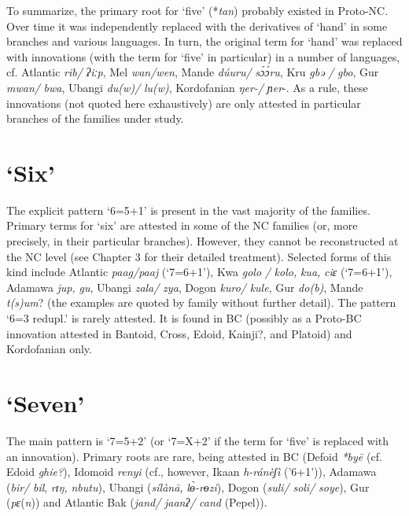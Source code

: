 To summarize, the primary root for ‘five’ (*\textit{tan}) probably existed in Proto-NC. Over time it was independently replaced with the derivatives of ‘hand’ in some branches and various languages. In turn, the original term for ‘hand’ was replaced with innovations (with the term for ‘five’ in particular) in a number of languages, cf. Atlantic \textit{rib/} \textit{ʔiːp}, Mel \textit{wan/wen}, Mande \textit{dúuru/} \textit{s{\'{ɔ}}{\'{ɔ}}ru}, Kru \textit{gbə} \textit{/} \textit{gbo}, Gur \textit{mwan/} \textit{bwa}, Ubangi \textit{du(w)/} \textit{lu(w)}, Kordofanian \textit{ŋer-/} \textit{ɲer}-. As a rule, these innovations (not quoted here exhaustively) are only attested in particular branches of the families under study. 


\section{‘Six’}%
 \largerpage
The explicit pattern ‘6=5+1’ is present in the vast majority of the families. Primary terms for ‘six’ are attested in some of the NC families (or, more precisely, in their particular branches). However, they cannot be reconstructed at the NC level (see Chapter 3 for their detailed treatment). Selected forms of this kind include Atlantic \textit{paag/paaj} (‘7=6+1’), Kwa \textit{golo} \textit{/} \textit{kolo,} \textit{kua,} \textit{ciɛ} (‘7=6+1’), Adamawa \textit{jup,} \textit{gu}, Ubangi \textit{zala/} \textit{zya}, Dogon \textit{kuro/} \textit{kule}, Gur \textit{do(b)}, Mande \textit{t(s)um}? (the examples are quoted by family without further detail). The pattern ‘6=3 redupl.’ is rarely attested. It is found in BC (possibly as a Proto-BC innovation attested in Bantoid, Cross, Edoid, Kainji?, and Platoid) and Kordofanian only.


\section{‘Seven’}%
The main pattern is ‘7=5+2’ (or ‘7=X+2’ if the term for ‘five’ is replaced with an innovation). Primary roots are rare, being attested in BC (Defoid \textit{*by{\={e}}} (cf. Edoid \textit{ghie?}), Idomoid \textit{renyi} (cf., however, Ikaan \textit{h-ránèʃì} ('6+1’)), Adamawa (\textit{bir/} \textit{bil}, \textit{rɪŋ,} \textit{nbutu}), Ubangi (\textit{sílàn{\={a}},} \textit{l{\`{ɵ}}-rɵzi}), Dogon (\textit{suli/} \textit{soli/} \textit{soye}), Gur (\textit{pɛ}(\textit{n})) and Atlantic Bak (\textit{jand/} \textit{jaanʔ/} \textit{cand} (Pepel)).

